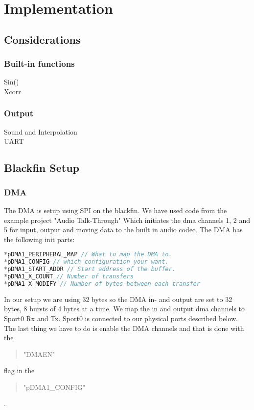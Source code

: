 \chapter{Implementation}
\section{Considerations}
\subsection{Built-in functions}
Sin()\\
Xcorr\\
\subsection{Output}
Sound and Interpolation\\
UART\\
\section{Blackfin Setup}
\subsection{DMA}
The DMA is setup using SPI on the blackfin. We have used code from the example project "Audio Talk-Through" Which initiates the dma channels 1, 2 and 5 for input, output and moving data to the built in audio codec. The DMA has the following init parts:
\begin{lstlisting}[language=C]
*pDMA1_PERIPHERAL_MAP // What to map the DMA to.
*pDMA1_CONFIG // which configuration your want.
*pDMA1_START_ADDR // Start address of the buffer.
*pDMA1_X_COUNT // Number of transfers
*pDMA1_X_MODIFY // Number of bytes between each transfer
\end{lstlisting}
In our setup we are using 32 bytes so the DMA in- and output are set to 32 bytes, 8 bursts of 4 bytes at a time. We map the in and output dma channels to Sport0 Rx and Tx. Sport0 is connected to our physical ports described below. The last thing we have to do is enable the DMA channels and that is done with the \begin{quote}
"DMAEN"
\end{quote}  flag in the 
\begin{quote}
"pDMA1\_CONFIG"
\end{quote}
.\\
